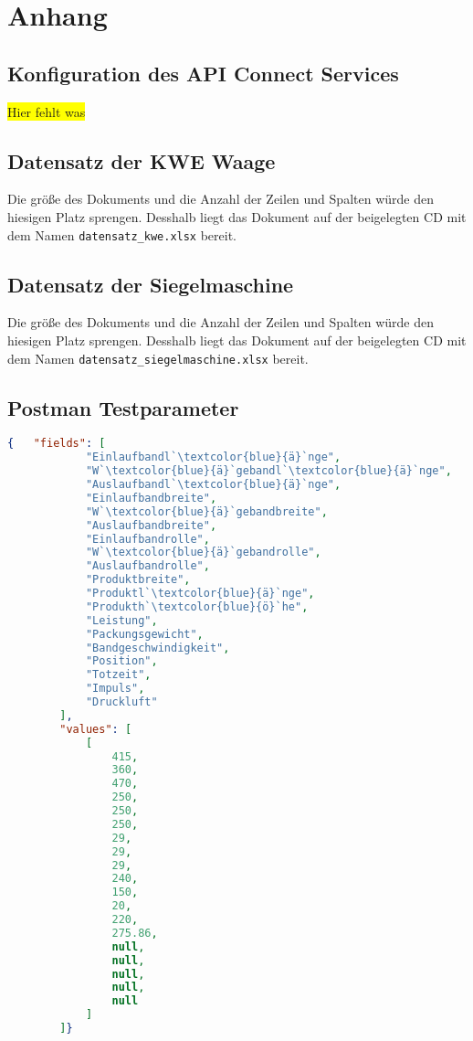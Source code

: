 \chapter{Anhang}
\label{ch:anhang}

\section{Konfiguration des API Connect Services}
\label{sec:konfigurationAPIConnect}
\colorbox{yellow}{Hier fehlt was}

\section{Datensatz der KWE Waage}
\label{sec:scaleData}
Die größe des Dokuments und die Anzahl der Zeilen und Spalten würde den hiesigen Platz sprengen. Desshalb liegt das
Dokument auf der beigelegten CD mit dem Namen \texttt{datensatz\_kwe.xlsx} bereit.

\section{Datensatz der Siegelmaschine}
\label{sec:hariboSiegel}
Die größe des Dokuments und die Anzahl der Zeilen und Spalten würde den hiesigen Platz sprengen. Desshalb liegt das
Dokument auf der beigelegten CD mit dem Namen \texttt{datensatz\_siegelmaschine.xlsx} bereit.

\newpage

\section{Postman Testparameter}
\label{sec:postmanTestparameter}

\begin{lstlisting}[language=json, caption=Testparameter für Postman, label=ls:anhang_postman, escapeinside=``]
    {   "fields": [
            "Einlaufbandl`\textcolor{blue}{ä}`nge",
            "W`\textcolor{blue}{ä}`gebandl`\textcolor{blue}{ä}`nge",
            "Auslaufbandl`\textcolor{blue}{ä}`nge",
            "Einlaufbandbreite",
            "W`\textcolor{blue}{ä}`gebandbreite",
            "Auslaufbandbreite",
            "Einlaufbandrolle",
            "W`\textcolor{blue}{ä}`gebandrolle",
            "Auslaufbandrolle",
            "Produktbreite",
            "Produktl`\textcolor{blue}{ä}`nge",
            "Produkth`\textcolor{blue}{ö}`he",
            "Leistung",
            "Packungsgewicht",
            "Bandgeschwindigkeit",
            "Position",
            "Totzeit",
            "Impuls",
            "Druckluft"
        ],
        "values": [
            [
                415,
                360,
                470,
                250,
                250,
                250,
                29,
                29,
                29,
                240,
                150,
                20,
                220,
                275.86,
                null,
                null,
                null,
                null,
                null
            ]
        ]}
\end{lstlisting}

